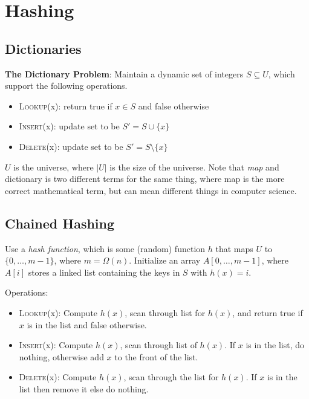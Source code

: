 \chapter{Hashing}

    \section{Dictionaries}
        \textbf{The Dictionary Problem}: Maintain a dynamic set of integers $S \subseteq U$, which support the following operations.

        \begin{itemize}
            \item \textsc{Lookup}(x): return true if $x \in S$ and false otherwise
            \item \textsc{Insert}(x): update set to be $S' = S \cup \{x\}$
            \item \textsc{Delete}(x): update set to be $S' = S \setminus \{x\}$
        \end{itemize}

        $U$ is the universe, where $|U|$ is the size of the universe.
        Note that \emph{map} and dictionary is two different terms for the same thing, where map is the more correct mathematical term, but can mean different things in computer science.

    \section{Chained Hashing}
        Use a \emph{hash function}, which is some (random) function $h$ that maps $U$ to $\{0, \ldots, m-1\}$, where $m = \Omega(n)$.
        Initialize an array $A[0, \ldots, m-1]$, where $A[i]$ stores a linked list containing the keys in $S$ with $h(x) = i$.

        Operations:
        \begin{itemize}
            \item \textsc{Lookup}(x): Compute $h(x)$, scan through list for $h(x)$, and return true if $x$ is in the list and false otherwise.
            \item \textsc{Insert}(x): Compute $h(x)$, scan through list of $h(x)$. If $x$ is in the list, do nothing, otherwise add $x$ to the front of the list.
            \item \textsc{Delete}(x): Compute $h(x)$, scan through the list for $h(x)$. If $x$ is in the list then remove it else do nothing.
        \end{itemize}

